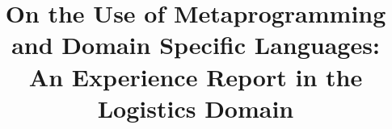 \documentclass{bmcart}
\begin{document}
\begin{frontmatter}

\begin{fmbox}


\title{On the Use of Metaprogramming and Domain Specific Languages: An Experience Report in the Logistics Domain}


\author[
   addressref={aff1},                   %
   corref={aff1},                       %
   email={pedro.costa@aluno.unb.br}   %
]{ }
\author[
   addressref={aff1},
   corref={aff1},
   email={ednacanedo@unb.br}
]{ }
\author[
	addressref={aff1},
	corref={aff1},
	email={rbonifacio@unb.br}
]{ }


\address[id=aff1]{%
  , %
  ,                     %
  ,                        %
}



\end{fmbox}
\end{frontmatter}
\end{document}
